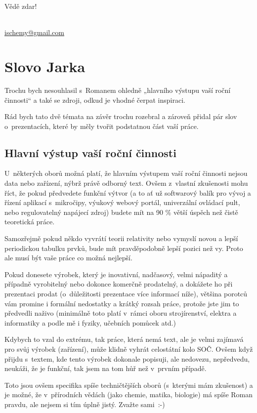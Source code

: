 \documentclass{template/socthesis}
\begin{document}
\vspace{\baselineskip}
\noindent Vědě zdar!

\vspace{\baselineskip}
\noindent {} \\
\url{ischemy@gmail.com}

\newpage
\section{Slovo Jarka} 
Trochu bych nesouhlasil s~Romanem ohledně „hlavního výstupu vaší roční činnosti“ a také se zdroji, odkud je vhodné čerpat inspiraci.

Rád bych tato dvě témata na závěr trochu rozebral a zároveň přidal pár slov o~prezentacích, které by měly tvořit podstatnou část vaší práce.

\subsection{Hlavní výstup vaší roční činnosti}
U~některých oborů možná platí, že hlavním výstupem vaší roční činnosti nejsou data nebo zařízení, nýbrž právě odborný text. Ovšem z~vlastní zkušenosti mohu říct, že pokud předvedete funkční výtvor (a to ať už softwarový balík pro vývoj a řízení aplikací s~mikročipy, výukový webový portál, univerzální ovládací pult, nebo regulovatelný napájecí zdroj) budete mít na 90 \% větší úspěch než čistě teoretická práce.

Samozřejmě pokud někdo vyvrátí teorii relativity nebo vymyslí novou a lepší periodickou tabulku prvků, bude mít pravděpodobně lepší pozici než vy. Proto ale musí být vaše práce co možná nejlepší. 

Pokud donesete výrobek, který je inovativní, nadčasový, velmi nápaditý a případně vyrobitelný nebo dokonce komerčně prodatelný, a dokážete ho při prezentaci prodat (o~důležitosti prezentace více informací níže), většina porotců vám promine i formální nedostatky a krátký rozsah práce, protože jste jim to předvedli naživo (minimálně toto platí v~rámci oboru strojírenství, elektra a informatiky a podle mě i fyziky, učebních pomůcek atd.)

Kdybych to vzal do extrému, tak práce, která nemá text, ale je velmi zajímavá pro svůj výrobek (zařízení), může klidně vyhrát celostátní kolo SOČ. Ovšem když přijdu s~textem, kde tento výrobek dokonale popisuji, ale nedovezu, nepředvedu, neukáži, že je funkční, tak jsem na tom hůř než v~prvním případě.

Toto jsou ovšem specifika spíše techničtějších oborů (s~kterými mám zkušenost) a je možné, že v~přírodních vědách (jako chemie, matika, biologie) má spíše Roman pravdu, ale nejsem si tím úplně jistý. Zvažte sami~:-)
\end{document}
